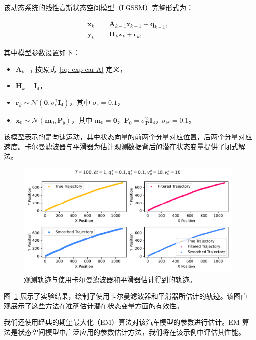该动态系统的线性高斯状态空间模型（LGSSM）完整形式为：

\begin{align}
    \mathbf{x}_k &= \mathbf{A}_{k-1} \mathbf{x}_{k-1} + \mathbf{q}_{k-1}, \\
    \mathbf{y}_k &= \mathbf{H}_k \mathbf{x}_{k} + \mathbf{r}_{k},
\end{align}

其中模型参数设置如下：
\begin{itemize}
    \item \(\mathbf{A}_{k-1}\) 按照式~\eqref{eq: exp car A} 定义，
    \item \(\mathbf{H}_k = \mathbf{I}_4\)，
    \item \(\mathbf{r}_k \sim \mathcal{N}(\mathbf{0}, \sigma_\mathbf{r}^2 \mathbf{I}_4)\)，其中 \(\sigma_\mathbf{r} = 0.1\)，
    \item \(\mathbf{x}_0 \sim \mathcal{N}(\mathbf{m}_0, \mathbf{P}_0)\)，其中 \(\mathbf{m}_0 = \mathbf{0}\)，\(\mathbf{P}_0 = \sigma_\mathbf{P}^2 \mathbf{I}_4\)，\(\sigma_\mathbf{P} = 0.1\)。
\end{itemize}

该模型表示的是匀速运动，其中状态向量的前两个分量对应位置，后两个分量对应速度。卡尔曼滤波器与平滑器为估计观测数据背后的潜在状态变量提供了闭式解法。

\begin{figure}
    \centering
    \includegraphics[width=0.95\linewidth]{fig/estimated_car_trajectory.pdf}
    \caption{观测轨迹与使用卡尔曼滤波器和平滑器估计得到的轨迹。}
    \label{fig: exp car trajectory}
\end{figure}

图~\ref{fig: exp car trajectory} 展示了实验结果，绘制了使用卡尔曼滤波器和平滑器所估计的轨迹。该图直观展示了这些方法在准确估计潜在状态变量方面的有效性。

我们还使用经典的期望最大化（EM）算法对该汽车模型的参数进行估计。EM 算法是状态空间模型中广泛应用的参数估计方法，我们将在该示例中评估其性能。

